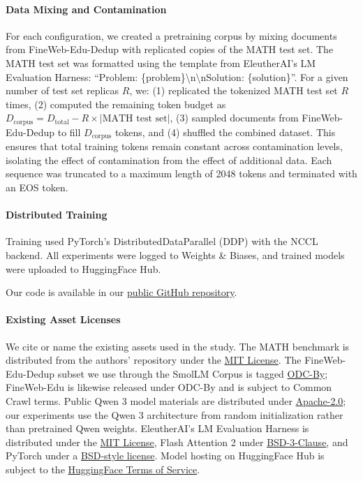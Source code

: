 \paragraph{Data Mixing and Contamination}
For each configuration, we created a pretraining corpus by mixing documents from FineWeb-Edu-Dedup \citep{penedo2024finewebdatasetsdecantingweb} with replicated copies of the MATH test set.
The MATH test set was formatted using the template from EleutherAI's LM Evaluation Harness: ``Problem: \{problem\}\textbackslash n\textbackslash nSolution: \{solution\}''.
For a given number of test set replicas $R$, we:
(1) replicated the tokenized MATH test set $R$ times,
(2) computed the remaining token budget as $D_{\text{corpus}} = D_{\text{total}} - R \times |\text{MATH test set}|$,
(3) sampled documents from FineWeb-Edu-Dedup to fill $D_{\text{corpus}}$ tokens, and
(4) shuffled the combined dataset.
This ensures that total training tokens remain constant across contamination levels, isolating the effect of contamination from the effect of additional data.
Each sequence was truncated to a maximum length of 2048 tokens and terminated with an EOS token.

\paragraph{Distributed Training}
Training used PyTorch's DistributedDataParallel (DDP) with the NCCL backend.
All experiments were logged to Weights \& Biases, and trained models were uploaded to HuggingFace Hub.


Our code is available in our \href{https://github.com/RylanSchaeffer/KoyejoLab-Test-Set-Contam-Generative-Evals}{public GitHub repository}.

\paragraph{Existing Asset Licenses}
We cite or name the existing assets used in the study. The MATH benchmark is distributed from the authors' repository under the \href{https://github.com/hendrycks/math/blob/main/LICENSE}{MIT License}. The FineWeb-Edu-Dedup subset we use through the SmolLM Corpus is tagged \href{https://huggingface.co/datasets/HuggingFaceTB/smollm-corpus/tree/main/fineweb-edu-dedup}{ODC-By}; FineWeb-Edu is likewise released under ODC-By and is subject to Common Crawl terms. Public Qwen 3 model materials are distributed under \href{https://huggingface.co/Qwen/Qwen3-0.6B/blob/main/LICENSE}{Apache-2.0}; our experiments use the Qwen 3 architecture from random initialization rather than pretrained Qwen weights. EleutherAI's LM Evaluation Harness is distributed under the \href{https://github.com/EleutherAI/lm-evaluation-harness/blob/main/LICENSE.md}{MIT License}, Flash Attention 2 under \href{https://github.com/Dao-AILab/flash-attention/blob/main/LICENSE}{BSD-3-Clause}, and PyTorch under a \href{https://github.com/pytorch/pytorch/blob/main/LICENSE}{BSD-style license}. Model hosting on HuggingFace Hub is subject to the \href{https://huggingface.co/terms-of-service}{HuggingFace Terms of Service}.

